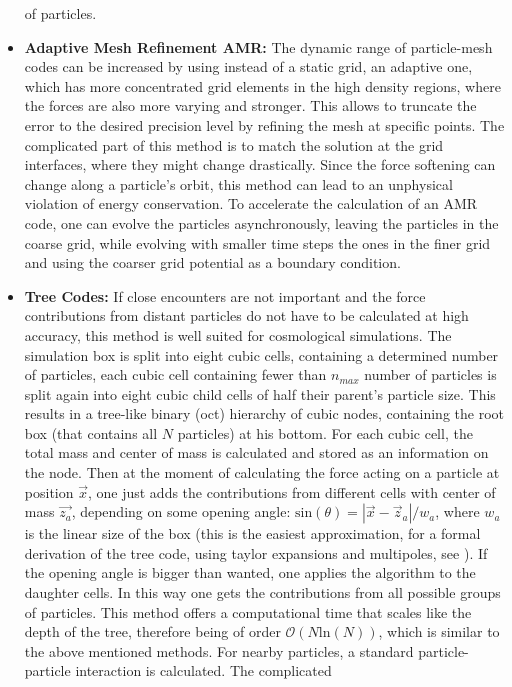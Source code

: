 \begin{itemize}
of particles.
\item \textbf{Adaptive Mesh Refinement AMR: }The dynamic range of particle-mesh
codes can be increased by using instead of a static grid, an adaptive
one, which has more concentrated grid elements in the high density
regions, where the forces are also more varying and stronger. This
allows to truncate the error to the desired precision level by refining
the mesh at specific points. The complicated part of this method is
to match the solution at the grid interfaces, where they might change
drastically. Since the force softening can change along a particle's
orbit, this method can lead to an unphysical violation of energy conservation.
To accelerate the calculation of an AMR code, one can evolve the particles
asynchronously, leaving the particles in the coarse grid, while evolving
with smaller time steps the ones in the finer grid and using the coarser
grid potential as a boundary condition.
\item \textbf{Tree Codes: }If close encounters are not important and the
force contributions from distant particles do not have to be calculated
at high accuracy, this method is well suited for cosmological simulations.
The simulation box is split into eight cubic cells, containing a determined
number of particles, each cubic cell containing fewer than $n_{max}$
number of particles is split again into eight cubic child cells of
half their parent's particle size. This results in a tree-like binary
(oct) hierarchy of cubic nodes, containing the root box (that contains
all $N$ particles) at his bottom. For each cubic cell, the total
mass and center of mass is calculated and stored as an information
on the node. Then at the moment of calculating the force acting on
a particle at position $\vec{x}$, one just adds the contributions
from different cells with center of mass $\vec{z_{a}}$, depending
on some opening angle: $\mbox{sin}(\theta)=\left|\vec{x}-\vec{z}_{a}\right|/w_{a}$,
where $w_{a}$ is the linear size of the box (this is the easiest
approximation, for a formal derivation of the tree code, using taylor
expansions and multipoles, see ). If the
opening angle is bigger than wanted, one applies the algorithm to
the daughter cells. In this way one gets the contributions from all
possible groups of particles. This method offers a computational time
that scales like the depth of the tree, therefore being of order $\mathcal{O}(N\mbox{ln}(N))$,
which is similar to the above mentioned methods. For nearby particles,
a standard particle-particle interaction is calculated. The complicated

\end{itemize}
